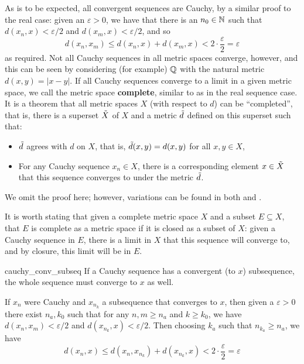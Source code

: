 As is to be expected, all convergent sequences are Cauchy, by a similar proof to the real case: given an $\varepsilon > 0$, we have that there is an $n_{0} \in \mathbb{N}$ such that $d(x_{n},x) < \varepsilon/2$ and $d(x_{m},x) < \varepsilon/2$, and so 
\[ d(x_{n}, x_{m}) \leq d(x_{n},x) + d(x_{m},x) < 2 \cdot \frac{\varepsilon}{2} = \varepsilon \] as required. Not all Cauchy sequences in all metric spaces converge, however, and this can be seen by considering (for example) $\mathbb{Q}$ with the natural metric $d(x,y) = |x-y|$. If all Cauchy sequences converge to a limit in a given metric space, we call the metric space \textbf{complete}, similar to as in the real sequence case. It is a theorem that all metric spaces $X$ (with respect to $d$) can be “completed”, that is, there is a superset $\Tilde{X}$ of $X$ and a metric $\Tilde{d}$ defined on this superset such that:
\begin{itemize}
    \item $\Tilde{d}$ agrees with $d$ on $X$, that is, $\Tilde{d}(x,y) = d(x,y)$ for all $x,y\in X$,
    \item For any Cauchy sequence $x_{n}\in X$, there is a corresponding element $x\in \Tilde{X}$ that this sequence converges to under the metric $\Tilde{d}$. 
\end{itemize}
We omit the proof here; however, variations can be found in both \cite{osearcoid} and \cite{munkres}.

It is worth stating that given a complete metric space $X$ and a subset $E\subseteq X$, that $E$ is complete as a metric space if it is closed as a subset of $X$: given a Cauchy sequence in $E$, there is a limit in $X$ that this sequence will converge to, and by closure, this limit will be in $E$. 

\begin{bprop}{}{cauchy_conv_subseq}
If a Cauchy sequence has a convergent (to $x$) subsequence, the whole sequence must converge to $x$ as well.
\end{bprop}
\begin{bproof}{}{}
If $x_{n}$ were Cauchy and $x_{n_{k}}$ a subsequence that converges to $x$, then given a $\varepsilon > 0$ there exist $n_{a},k_{0}$ such that for any $n,m\geq n_{a}$ and $k \geq k_{0}$, we have $d(x_{n},x_{m}) < \varepsilon/2$ and $d(x_{n_{k}}, x) < \varepsilon/2$. Then choosing $k_{a}$ such that $n_{k_{a}} \geq n_{a}$, we have
\[ d(x_{n},x) \leq d(x_{n}, x_{n_{k}}) + d(x_{n_{k}},x) < 2\cdot \frac{\varepsilon}{2} = \varepsilon \]
\eop
\end{bproof}

